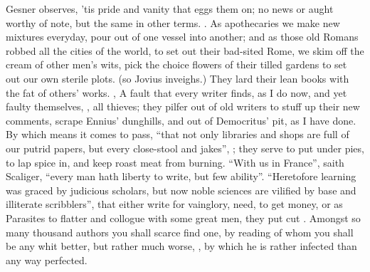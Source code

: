 Gesner observes, 'tis pride and vanity that eggs them on; no
news or aught worthy of note, but the same in other terms. .
As apothecaries we make new mixtures everyday, pour out of one vessel into
another; and as those old Romans robbed all the cities of the world, to set out
their bad-sited Rome, we skim off the cream of other men's wits, pick the
choice flowers of their tilled gardens to set out our own sterile plots.
 (so
Jovius inveighs.) They lard their lean books with the fat of
others' works. , \etc{} A fault that every writer finds, as
I do now, and yet faulty themselves, , all thieves; they pilfer out of old writers to stuff up their new
comments, scrape Ennius' dunghills, and out of Democritus'
pit, as I have done. By which means it comes to pass, \enquote{that
not only libraries and shops are full of our putrid papers, but every
close-stool and jakes}, ; they serve
to put under pies, to lap spice in, and keep roast meat from
burning. \enquote{With us in France}, saith Scaliger, \enquote{every man
hath liberty to write, but few ability}. \enquote{Heretofore
learning was graced by judicious scholars, but now noble sciences are vilified
by base and illiterate scribblers}, that either write for vainglory, need, to
get money, or as Parasites to flatter and collogue with some great men, they
put cut .
Amongst so many thousand authors you shall scarce find one,
by reading of whom you shall be any whit better, but rather much worse,
, by which he is rather infected
than any way perfected.


